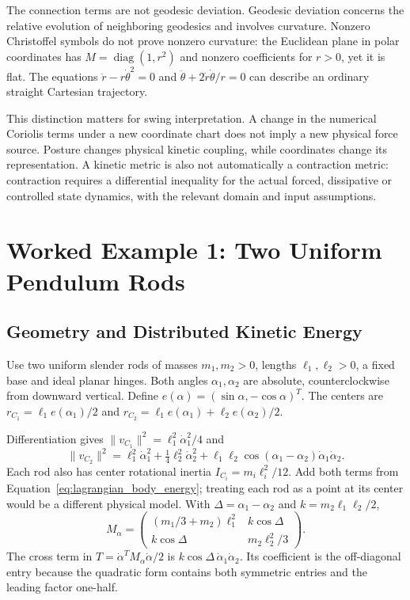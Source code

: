 The connection terms are not geodesic deviation. Geodesic deviation concerns the relative evolution of neighboring geodesics and involves curvature. Nonzero Christoffel symbols do not prove nonzero curvature: the Euclidean plane in polar coordinates has $M=\operatorname{diag}(1,r^2)$ and nonzero coefficients for $r>0$, yet it is flat. The equations $\ddot r-r\dot\theta^2=0$ and $\ddot\theta+2\dot r\dot\theta/r=0$ can describe an ordinary straight Cartesian trajectory.

This distinction matters for swing interpretation. A change in the numerical Coriolis terms under a new coordinate chart does not imply a new physical force source. Posture changes physical kinetic coupling, while coordinates change its representation. A kinetic metric is also not automatically a contraction metric: contraction requires a differential inequality for the actual forced, dissipative or controlled state dynamics, with the relevant domain and input assumptions.

\section{Worked Example 1: Two Uniform Pendulum Rods}
\label{sec:lagrangian_double_pendulum}

\subsection{Geometry and Distributed Kinetic Energy}
\label{subsec:lagrangian_rods_geometry}

Use two uniform slender rods of masses $m_1,m_2>0$, lengths $\ell_1,\ell_2>0$, a fixed base and ideal planar hinges. Both angles $\alpha_1,\alpha_2$ are absolute, counterclockwise from downward vertical. Define $e(\alpha)=(\sin\alpha,-\cos\alpha)^T$. The centers are $r_{C_1}=\ell_1e(\alpha_1)/2$ and $r_{C_2}=\ell_1e(\alpha_1)+\ell_2e(\alpha_2)/2$.

Differentiation gives $\|v_{C_1}\|^2=\ell_1^2\dot\alpha_1^2/4$ and
\begin{equation}
\|v_{C_2}\|^2=\ell_1^2\dot\alpha_1^2+
\tfrac14\ell_2^2\dot\alpha_2^2+
\ell_1\ell_2\cos(\alpha_1-\alpha_2)\dot\alpha_1\dot\alpha_2.
\label{eq:lagrangian_rods_velocity}
\end{equation}
Each rod also has center rotational inertia $I_{C_i}=m_i\ell_i^2/12$. Add both terms from Equation~\ref{eq:lagrangian_body_energy}; treating each rod as a point at its center would be a different physical model. With $\Delta=\alpha_1-\alpha_2$ and $k=m_2\ell_1\ell_2/2$,
\begin{equation}
M_\alpha=
\begin{pmatrix}
(m_1/3+m_2)\ell_1^2&k\cos\Delta\\
k\cos\Delta&m_2\ell_2^2/3
\end{pmatrix}.
\label{eq:lagrangian_rods_mass}
\end{equation}
The cross term in $T=\dot\alpha^TM_\alpha\dot\alpha/2$ is $k\cos\Delta\,\dot\alpha_1\dot\alpha_2$. Its coefficient is the off-diagonal entry because the quadratic form contains both symmetric entries and the leading factor one-half.

